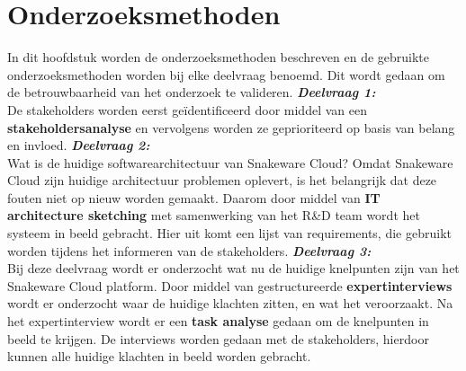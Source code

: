 \section{Onderzoeksmethoden}
In dit hoofdstuk worden de onderzoeksmethoden beschreven en de gebruikte onderzoeksmethoden worden bij elke deelvraag benoemd.
Dit wordt gedaan om de betrouwbaarheid van het onderzoek te valideren.
\whitespace
\textit{\textbf{Deelvraag 1:} \SubquestionOne} \\
De stakeholders worden eerst geïdentificeerd door middel van een \textbf{stakeholdersanalyse} en vervolgens worden ze geprioriteerd op basis van belang en invloed.
\whitespace
\textit{\textbf{Deelvraag 2:} \SubquestionTwo} \\
Wat is de huidige softwarearchitectuur van Snakeware Cloud?
Omdat Snakeware Cloud zijn huidige architectuur problemen oplevert, is het belangrijk dat deze fouten niet op nieuw worden gemaakt.
Daarom door middel van \textbf{IT architecture sketching} met samenwerking van het R\&D team wordt het systeem in beeld gebracht.
Hier uit komt  een lijst van requirements, die gebruikt worden tijdens het informeren van de stakeholders.
\whitespace
\textit{\textbf{Deelvraag 3:} \SubquestionThree} \\
Bij deze deelvraag wordt er onderzocht wat nu de huidige knelpunten zijn van het Snakeware Cloud platform.
Door middel van gestructureerde \textbf{expertinterviews} wordt er onderzocht waar de huidige klachten zitten, en wat het veroorzaakt.
Na het expertinterview wordt er een \textbf{task analyse} gedaan om de knelpunten in beeld te krijgen.
De interviews worden gedaan met de stakeholders, hierdoor kunnen alle huidige klachten in beeld worden gebracht.
\whitespace
